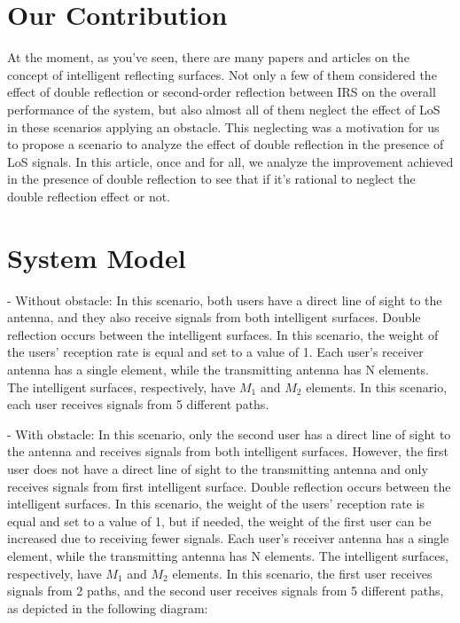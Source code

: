 \documentclass[11pt,twocolumn,twoside]{opticajnl}
\begin{document}
\section{Our Contribution}
At the moment, as you've seen, there are many papers and articles on the concept of intelligent reflecting surfaces. Not only a few of them considered the effect of double reflection or second-order reflection between IRS on the overall performance of the system, but also almost all of them neglect the effect of LoS in these scenarios applying an obstacle.
This neglecting was a motivation for us to propose a scenario to analyze the effect of double reflection in the presence of LoS signals. 
In this article, once and for all, we analyze the improvement achieved in the presence of double reflection to see that if it's rational to
neglect the double reflection effect or not.
\section{System Model}
- Without obstacle: In this scenario, both users have a direct line of sight to the antenna, and they also receive signals from both intelligent surfaces. Double reflection occurs between the intelligent surfaces. In this scenario, the weight of the users' reception rate is equal and set to a value of 1. Each user's receiver antenna has a single element, while the transmitting antenna has N elements. The intelligent surfaces, respectively, have $M_1$ and $M_2$ elements. In this scenario, each user receives signals from 5 different paths.

- With obstacle: In this scenario, only the second user has a direct line of sight to the antenna and receives signals from both intelligent surfaces. However, the first user does not have a direct line of sight to the transmitting antenna and only receives signals from first intelligent surface. Double reflection occurs between the intelligent surfaces. In this scenario, the weight of the users' reception rate is equal and set to a value of 1, but if needed, the weight of the first user can be increased due to receiving fewer signals. Each user's receiver antenna has a single element, while the transmitting antenna has N elements. The intelligent surfaces, respectively, have $M_1$ and $M_2$ elements. In this scenario, the first user receives signals from 2 paths, and the second user receives signals from 5 different paths, as depicted in the following diagram:
\end{document}
